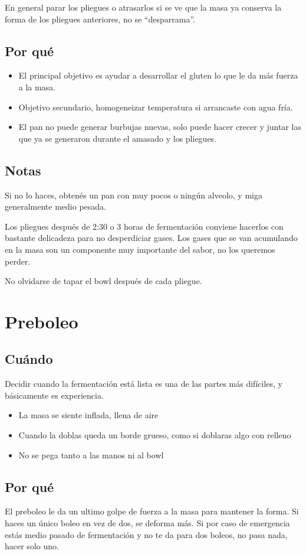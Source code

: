 \documentclass[10pt,a4paper]{article}
\begin{document}
En general parar los pliegues o atrasarlos  si se ve que la masa
ya conserva la forma de los pliegues anteriores, no se ``desparrama''.

\subsection*{Por qué}
\begin{itemize}
\item El principal objetivo es ayudar a desarrollar el gluten lo que le da más
  fuerza a la masa.
\item Objetivo secundario, homogeneizar temperatura si arrancaste con agua fría.
\item El pan no puede generar burbujas nuevas, solo puede hacer crecer y
  juntar las que ya se generaron durante el amasado y los pliegues.
\end{itemize}

\subsection*{Notas}
Si no lo haces, obtenés un pan con muy pocos o ningún alveolo, y miga
generalmente medio pesada.

Los pliegues después de 2:30 o 3 horas de fermentación conviene hacerlos con
bastante delicadeza para no desperdiciar gases. Los gases que se van acumulando
en la masa son un componente muy importante del sabor, no los queremos perder.

No olvidarse de tapar el bowl después de cada pliegue.

\section{Preboleo}
\subsection*{Cuándo}
Decidir cuando la fermentación está lista es una de las partes más difíciles, y
básicamente es experiencia.

\begin{itemize}
\item La masa se siente inflada, llena de aire
\item Cuando la doblas queda un borde grueso, como si doblaras algo con relleno
\item No se pega tanto a las manos ni al bowl
\end{itemize}
\subsection*{Por qué}
El preboleo le da un ultimo golpe de fuerza a la masa para mantener la forma. Si
haces un único boleo en vez de dos, se deforma más. Si por caso de emergencia
estás medio pasado de fermentación y no te da para dos boleos, no pasa nada,
hacer solo uno.
\end{document}

